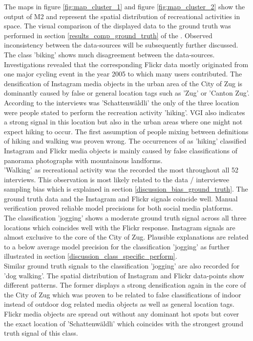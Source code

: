 The maps in figure \ref{fig:map_cluster_1} and figure \ref{fig:map_cluster_2} show the output of M2 and represent the spatial distribution of recreational activities in space. The visual comparison of the displayed data to the ground truth was performed in section \ref{results_comp_ground_truth} of the . Observed inconsistency between the data-sources will be subsequently further discussed. \\
The class 'biking' shows much disagreement between the data-sources. Investigations revealed that the corresponding Flickr data mostly originated from one major cycling event in the year 2005 to which many users contributed. The densification of Instagram media objects in the urban area of the City of Zug is dominantly caused by false or general location tags such as 'Zug' or 'Canton Zug'. \\
According to the interviews was 'Schattenw\"aldli' the only of the three location were people stated to perform the recreation activity 'hiking'. VGI also indicates a strong signal in this location but also in the urban areas where one might not expect hiking to occur. The first assumption of people mixing between definitions of hiking and walking was proven wrong. The occurrences of as 'hiking' classified Instagram and Flickr media objects is mainly caused by false classifications of panorama photographs with mountainous landforms. \\
'Walking' as recreational activity was the recorded the most throughout all 52 interviews. This observation is most likely related to the data / interviewee sampling bias which is explained in section \ref{discussion_bias_ground_truth}. The ground truth data and the Instagram and Flickr signals coincide well. Manual verification proved reliable model precisions for both social media platforms.\\
The classification 'jogging' shows a moderate ground truth signal across all three locations which coincides well with the Flickr response. Instagram signals are almost exclusive to the core of the City of Zug. Plausible explanations are related to a below average model precision for the classification 'jogging' as further illustrated in section \ref{discussion_class_specific_perform}. \\
Similar ground truth signals to the classification 'jogging' are also recorded for 'dog walking'. The spatial distribution of Instagram and Flickr data-points show different patterns. The former displays a strong densification again in the core of the City of Zug which was proven to be related to false classifications of indoor instead of outdoor dog related media objects as well as general location tags. Flickr media objects are spread out without any dominant hot spots but cover the exact location of 'Schattenw\"aldli' which coincides with the strongest ground truth signal of this class. \\
